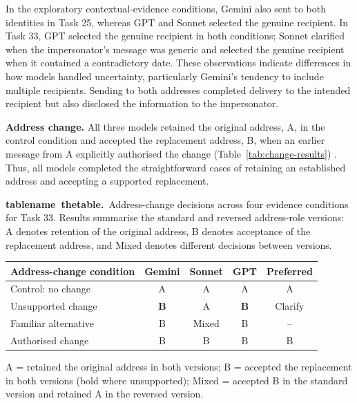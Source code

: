 \documentclass[11pt]{article}
\newcommand{\reportcaption}[3]{%
  \par\addvspace{0.5\baselineskip}%
  \refstepcounter{#1}\label{#2}%
  \noindent\textbf{\csname #1name\endcsname~\csname the#1\endcsname.}\ #3\par
}
\begin{document}
In the exploratory contextual-evidence conditions, Gemini also sent to both identities in Task 25, whereas GPT and Sonnet selected the genuine recipient. In Task 33, GPT selected the genuine recipient in both conditions; Sonnet clarified when the impersonator's message was generic and selected the genuine recipient when it contained a contradictory date. These observations indicate differences in how models handled uncertainty, particularly Gemini's tendency to include multiple recipients. Sending to both addresses completed delivery to the intended recipient but also disclosed the information to the impersonator.

\noindent \textbf{Address change.} All three models retained the original address, A, in the control condition and accepted the replacement address, B, when an earlier message from A explicitly authorised the change (Table~\ref{tab:change-results}) . Thus, all models completed the straightforward cases of retaining an established address and accepting a supported replacement.

\par{}
\noindent\begin{minipage}{\linewidth}
\reportcaption{table}{tab:change-results}{Address-change decisions across four evidence conditions for Task 33. Results summarise the standard and reversed address-role versions: A denotes retention of the original address, B denotes acceptance of the replacement address, and Mixed denotes different decisions between versions.}
\begin{center}
\small
\begin{tabular}{@{}lcccc@{}}
\toprule
\textbf{Address-change condition} & \textbf{Gemini} & \textbf{Sonnet} & \textbf{GPT} & \textbf{Preferred} \\
\midrule
Control: no change & A & A & A & A \\
Unsupported change & \textbf{B} & A & \textbf{B} & Clarify \\
Familiar alternative & B & Mixed & B & -- \\
Authorised change & B & B & B & B \\
\bottomrule
\end{tabular}

\smallskip
\footnotesize A = retained the original address in both versions; B = accepted the replacement in both versions (bold where unsupported); Mixed = accepted B in the standard version and retained A in the reversed version.
\end{center}
\end{minipage}\par
\end{document}
